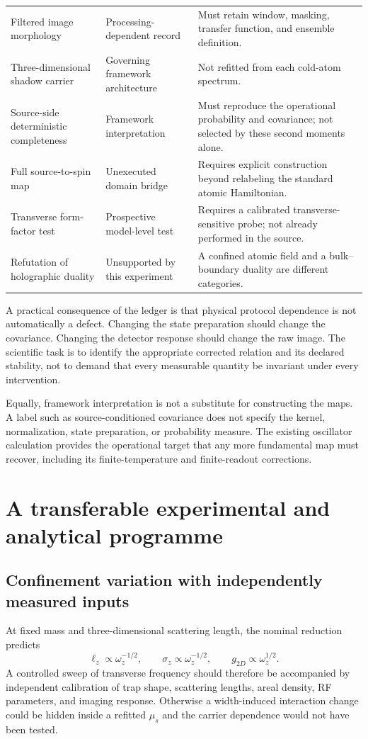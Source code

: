 \documentclass[11pt,a4paper]{article}
\theoremstyle{definition}
\theoremstyle{remark}
\newcommand{\lop}{\ell_z}
\begin{document}
\begin{longtable}{@{}L{0.25\textwidth}L{0.27\textwidth}L{0.40\textwidth}@{}}
Filtered image morphology & Processing-dependent record & Must retain window, masking, transfer function, and ensemble definition.\\
Three-dimensional shadow carrier & Governing framework architecture & Not refitted from each cold-atom spectrum.\cite{foundation}\\
Source-side deterministic completeness & Framework interpretation & Must reproduce the operational probability and covariance; not selected by these second moments alone.\cite{born}\\
Full source-to-spin map & Unexecuted domain bridge & Requires explicit construction beyond relabeling the standard atomic Hamiltonian.\\
Transverse form-factor test & Prospective model-level test & Requires a calibrated transverse-sensitive probe; not already performed in the source.\\
Refutation of holographic duality & Unsupported by this experiment & A confined atomic field and a bulk--boundary duality are different categories.\\
\end{longtable}

A practical consequence of the ledger is that physical protocol dependence is not automatically a defect. Changing the state preparation should change the covariance. Changing the detector response should change the raw image. The scientific task is to identify the appropriate corrected relation and its declared stability, not to demand that every measurable quantity be invariant under every intervention.

Equally, framework interpretation is not a substitute for constructing the maps. A label such as source-conditioned covariance does not specify the kernel, normalization, state preparation, or probability measure. The existing oscillator calculation provides the operational target that any more fundamental map must recover, including its finite-temperature and finite-readout corrections.\cite{foundation,zhang2026}

\section{A transferable experimental and analytical programme}
\label{sec:tests}
\subsection{Confinement variation with independently measured inputs}
At fixed mass and three-dimensional scattering length, the nominal reduction predicts
\begin{equation}
 \lop\propto\omega_z^{-1/2},\qquad
 \sigma_z\propto\omega_z^{-1/2},\qquad
 g_{2D}\propto\omega_z^{1/2}.
 \label{eq:confinement_prediction}
\end{equation}
A controlled sweep of transverse frequency should therefore be accompanied by independent calibration of trap shape, scattering lengths, areal density, RF parameters, and imaging response. Otherwise a width-induced interaction change could be hidden inside a refitted $\mu_s$ and the carrier dependence would not have been tested.
\end{document}
